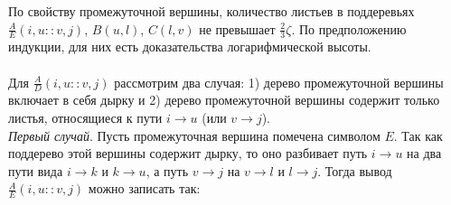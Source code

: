 По свойству промежуточной вершины, количество листьев в поддеревьях $\frac{A}{E}(i , u :: v , j)$, $B(u, l)$, $C(l, v)$ не превышает $\frac{2}{3}\zeta$. По предположению индукции, для них есть доказательства логарифмической высоты.
\\
\\Для  $\frac{A}{D}(i , u :: v , j)$ рассмотрим два случая: 1) дерево промежуточной вершины включает в себя дырку и 2) дерево промежуточной вершины содержит только листья, относящиеся к пути $i \rightarrow u$ (или $v \rightarrow j$).
\\\textit{Первый случай}. Пусть промежуточная вершина помечена символом $E$. Так как поддерево этой вершины содержит дырку, то оно разбивает путь  $i \rightarrow u$ на два пути вида  $i \rightarrow k$ и  $k \rightarrow u$, а путь $v \rightarrow j$ на  $v \rightarrow l$ и  $l \rightarrow j$.
Тогда вывод  $\frac{A}{E}(i , u :: v , j)$ можно записать так:
\begin{prooftree}
\end{prooftree}

